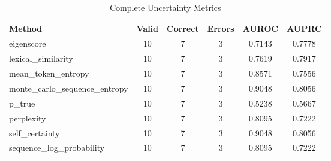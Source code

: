 \begin{table}[htbp]
\centering
\caption{Complete Uncertainty Metrics}
\label{tab:uq_metrics_full}
\begin{tabular}{lccccc}
\hline
Method & Valid & Correct & Errors & AUROC & AUPRC \\
\hline
eigenscore & 10 & 7 & 3 & 0.7143 & 0.7778 \\
lexical_similarity & 10 & 7 & 3 & 0.7619 & 0.7917 \\
mean_token_entropy & 10 & 7 & 3 & 0.8571 & 0.7556 \\
monte_carlo_sequence_entropy & 10 & 7 & 3 & 0.9048 & 0.8056 \\
p_true & 10 & 7 & 3 & 0.5238 & 0.5667 \\
perplexity & 10 & 7 & 3 & 0.8095 & 0.7222 \\
self_certainty & 10 & 7 & 3 & 0.9048 & 0.8056 \\
sequence_log_probability & 10 & 7 & 3 & 0.8095 & 0.7222 \\
\hline
\end{tabular}
\end{table}